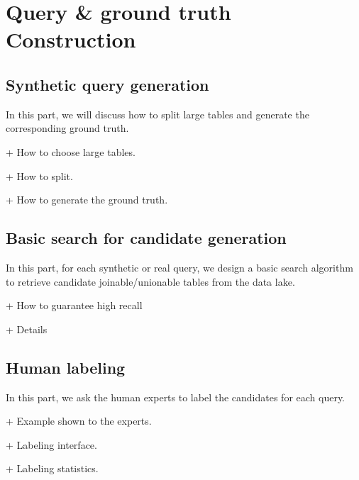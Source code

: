 \section{Query \& ground truth Construction}

\subsection{Synthetic query generation}
In this part, we will discuss how to split large tables and generate the corresponding ground truth.

+ How to choose large tables.

+ How to split.

+ How to generate the ground truth.

\subsection{Basic search for candidate generation}
In this part, for each synthetic or real query, we design a basic search algorithm to retrieve  candidate joinable/unionable tables from the data lake.


+ How to guarantee high recall

+ Details


\subsection{Human labeling}
In this part, we ask the human experts to label the candidates for each query. 

+ Example shown to the experts.


+ Labeling interface.


+ Labeling statistics.
